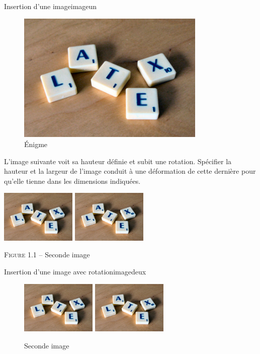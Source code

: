 \begin{codedoublefaux}{Insertion d'une image}{imageun}
\begin{figure}[!ht] 
\centering 
\includegraphics[width=9cm]{images/lettres.jpg} 
\caption{\'{E}nigme}
\end{figure}
\end{codedoublefaux}


L'image suivante voit sa hauteur définie et subit une rotation. Spécifier la hauteur et la largeur de l'image conduit à une déformation de cette dernière pour qu'elle tienne dans les dimensions indiquées.

\begin{codedoublevrai}
\centering 
\includegraphics[height=2.5cm,angle=30]{images/lettres.jpg}
\includegraphics[height=2.5cm,angle=-30]{images/lettres.jpg}
\par\vspace{0.8\baselineskip} \textsc{Figure 1.1} -- Seconde image
\end{codedoublevrai}

\begin{codedoublefaux}{Insertion d'une image avec rotation}{imagedeux}
\begin{figure}[!ht] 
\centering 
\includegraphics[height=2.5cm,angle=30]{images/lettres.jpg} 
\includegraphics[height=2.5cm,angle=-30]{images/lettres.jpg}
\caption{Seconde image}
\end{figure}
\end{codedoublefaux}

